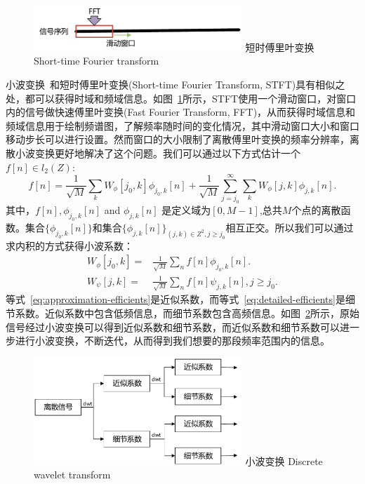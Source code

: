 \begin{figure}[!htp]
  \centering
  \includegraphics[width=0.7\textwidth]{figure/stft.pdf}
  \bicaption
    {短时傅里叶变换}
    {Short-time Fourier transform}
  \label{fig:stft}
\end{figure}
小波变换~\cite{chun2010tutorial}和短时傅里叶变换(Short-time Fourier Transform, STFT)具有相似之处，都可以获得时域和频域信息。如图~\ref{fig:stft}所示，STFT使用一个滑动窗口，对窗口内的信号做快速傅里叶变换(Fast Fourier Transform, FFT)，从而获得时域信息和频域信息用于绘制频谱图，了解频率随时间的变化情况，其中滑动窗口大小和窗口移动步长可以进行设置。然而窗口的大小限制了离散傅里叶变换的频率分辨率，离散小波变换更好地解决了这个问题。我们可以通过以下方式估计一个$f[n] \in l_{2}(Z)$:
\begin{equation}
f[n] = \frac{1}{\sqrt{M}}\sum_{k} W_{\phi}[j_{0},k]\phi_{j_{0},k}[n] + \frac{1}{\sqrt{M}}\sum_{j=j_{0}}^{\infty}\sum_{k}W_{\phi}[j,k]\phi_{j,k}[n].
\end{equation}
其中，$f[n],\phi_{j_{0},k}[n]$ and $\phi_{j,k}[n]$ 是定义域为$[0,M-1]$,总共$M$个点的离散函数。集合$\{\phi_{j_{0},k}[n]\}$和集合$\{\phi_{j,k}[n]\}_{(j,k)\in Z^{2}, j \geq j_{0}}$相互正交。所以我们可以通过求内积的方式获得小波系数：
\begin{align}
W_{\phi}[j_{0},k]=&\frac{1}{\sqrt{M}}\sum_{n}f[n]\phi_{j_{0},k}[n]. \label{eq:approximation-efficients} \\
W_{\psi}[j,k] =& \frac{1}{\sqrt{M}}\sum_{n}f[n]\psi_{j,k}[n],  j \geq j_{0}. \label{eq:detailed-efficients}
\end{align}
等式~\ref{eq:approximation-efficients}是近似系数，而等式~\ref{eq:detailed-efficients}是细节系数。近似系数中包含低频信息，而细节系数包含高频信息。如图~\ref{fig:dwt}所示，原始信号经过小波变换可以得到近似系数和细节系数，而近似系数和细节系数可以进一步进行小波变换，不断迭代，从而得到我们想要的那段频率范围内的信息。
\begin{figure}[!htp]
  \centering
  \includegraphics[width=0.7\textwidth]{figure/dwt.pdf}
  \bicaption
    {小波变换}
    {Discrete wavelet transform}
  \label{fig:dwt}
\end{figure}

